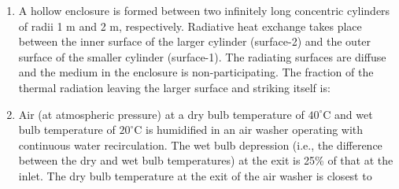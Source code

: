 \documentclass[journal]{IEEEtran}
\numberwithin{equation}{enumi}
\numberwithin{figure}{enumi}
\begin{document}
\begin{enumerate}
\begin{enumerate}
\end{enumerate}
\item A hollow enclosure is formed between two infinitely long concentric cylinders of radii 1 m and 2 m, respectively. Radiative heat exchange takes place between the inner surface of the larger cylinder (surface-2) and the outer surface of the smaller cylinder (surface-1). The radiating surfaces are diffuse and the medium in the enclosure is non-participating. The fraction of the thermal radiation leaving the larger surface and striking itself is:
\begin{figure}[!ht]
\centering
{}%


\label{fig:my_label}
\end{figure}
\begin{enumerate}
\end{enumerate} 
\item Air (at atmospheric pressure) at a dry bulb temperature of $40^\circ \text{C}$ and wet bulb temperature of $20^\circ \text{C}$ is humidified in an air washer operating with continuous water recirculation. The wet bulb depression (i.e., the difference between the dry and wet bulb temperatures) at the exit is 25\% of that at the inlet. The dry bulb temperature at the exit of the air washer is closest to


\end{enumerate}
\end{document}
